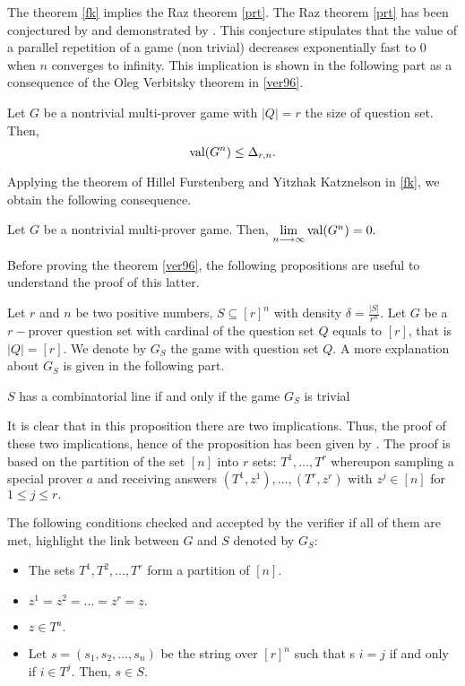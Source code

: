 The theorem \eqref{fk} implies the Raz theorem \eqref{prt}. The Raz theorem \eqref{prt} has been conjectured by \cite{feige1992two} and demonstrated by \cite{raz1998parallel}. This conjecture stipulates that the value of a parallel repetition of a game (non trivial) decreases exponentially  fast to $0$ when $n$ converges to infinity. This implication is shown in the following part as a consequence of the Oleg Verbitsky theorem in  \eqref{ver96}.

\begin{thm}	 Let $G$ be a nontrivial multi-prover game with $|Q|=r$ the size of question set. Then, 
$$\mathrm{val} (G^n) \leq \Delta_{r,n}.$$	\label{ver96} \end{thm} 

Applying the theorem of Hillel Furstenberg and Yitzhak Katznelson in \eqref{fk}, we obtain the following consequence.
\begin{cor}	Let $G$ be a nontrivial multi-prover game. Then, $\lim\limits_{n\longrightarrow \infty} \mathrm{val} (G^n)=0.$ 	\end{cor}

Before proving the theorem \eqref{ver96}, the following propositions are useful to understand the proof of this latter.

Let $r$ and $n$ be two positive numbers,  $S \subseteq [r]^n$ with density $\delta=\frac{|S|}{r^n}.$ Let $G$ be a $r-$prover question set with  cardinal of the question set $Q$ equals to $[r]$, that is $|Q|=[r].$  We denote by $G_S$  the game with question set $Q$. A more explanation about $G_S$ is given in the following part.

\begin{pro} $S$ has a combinatorial line if and only if the game $G_S$ is trivial	 \label{pr1}	\end{pro}

It is clear that in this proposition there are two implications. Thus, the proof of these two implications, hence of the  proposition has been given by \cite{hkazla2016forbidden}. The proof is based on the partition of the set $[n]$ into $r$ sets: $T^1, \ldots, T^r$ whereupon sampling a special prover $a$ and receiving answers $(T^1, z^1), \ldots, (T^r, z^r)$ with $z^j \in [n]$ for $1\leq j \leq r.$ 

The following conditions checked and accepted  by the verifier  if all of them are met, highlight  the link between $G$ and $S$ denoted by $G_S$:
\begin{itemize}
\item The sets $T^1, T^2,\ldots, T^r$ form a partition of $[n].$
\item $z^1=z^2=\ldots=z^r=z.$
\item $z \in T^a.$
\item Let $s = (s_1, s_2, \ldots, s_n)$ be the string over $[r]^n$ such that s $i = j$ if and only if $i \in  T ^j.$ Then, $s \in S.$
\end{itemize}


